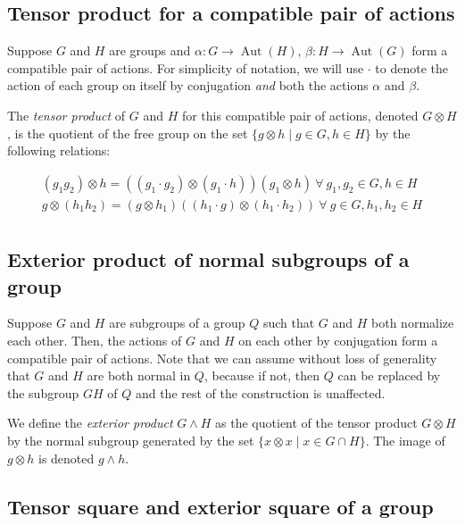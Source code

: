 \subsection{Tensor product for a compatible pair of actions}\label{sec:tensorproduct-explicit}

Suppose $G$ and $H$ are groups and $\alpha:G \to
\operatorname{Aut}(H)$, $\beta:H \to \operatorname{Aut}(G)$ form a
compatible pair of actions. For simplicity of notation, we will use
$\cdot$ to denote the action of each group on itself by conjugation
{\em and} both the actions $\alpha$ and $\beta$.

The {\em tensor product} of $G$ and $H$ for this compatible pair of
actions, denoted $G \otimes H$, is the quotient of the free group on
the set $\{ g \otimes h \mid g \in G, h \in H \}$ by the following
relations:

\begin{eqnarray*}
  (g_1g_2) \otimes h = ((g_1 \cdot g_2) \otimes (g_1 \cdot h))(g_1 \otimes h) \ \forall \ g_1,g_2 \in G, h \in H\\
  g \otimes (h_1h_2) = (g \otimes h_1)((h_1 \cdot g) \otimes (h_1 \cdot h_2)) \ \forall \ g \in G, h_1,h_2 \in H\\
\end{eqnarray*}

\subsection{Exterior product of normal subgroups of a group}

Suppose $G$ and $H$ are subgroups of a group $Q$ such that $G$ and $H$
both normalize each other. Then, the actions of $G$ and $H$ on each
other by conjugation form a compatible pair of actions. Note that we
can assume without loss of generality that $G$ and $H$ are both normal
in $Q$, because if not, then $Q$ can be replaced by the subgroup $GH$
of $Q$ and the rest of the construction is unaffected.

We define the {\em exterior product} $G \wedge H$ as the quotient of
the tensor product $G \otimes H$ by the normal subgroup generated by
the set $\{ x \otimes x \mid x \in G \cap H \}$. The image of $g
\otimes h$ is denoted $g \wedge h$.

\subsection{Tensor square and exterior square of a group}\label{sec:exteriorsquare-explicit}

